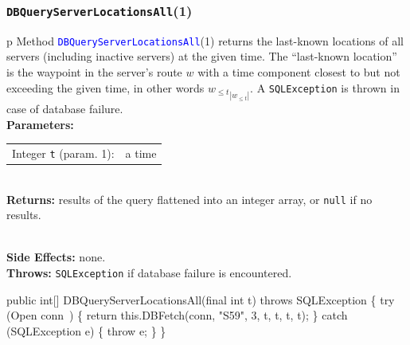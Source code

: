 \documentclass{article}
\def\nwendcode{\endtrivlist \endgroup}      %
\let\nwdocspar=\par
\theoremstyle{definition}                   %
\begin{document}
\subsubsection{{\tt{}\protect{}DBQueryServerLocationsAll}(1)}
\begin{tabular}{p{\textwidth}}
\toprule
{}
Method \textcolor{blue}{{\tt{}\protect{}DBQueryServerLocationsAll}}(1) returns the
last-known locations of all servers (including inactive servers) at the given
time. The ``last-known location'' is the waypoint in the server's route $w$
with a time component closest to but not exceeding the given time, in other
words ${w_{\leq t}}_{|w_{\leq t}|}$.
A {\tt{}SQLException} is thrown in case of database failure.\\
\midrule
\textbf{Parameters:} \\
\begin{tabular}{lp{116mm}}
Integer {\tt{}t} (param. 1):&a time
\end{tabular}\\
\textbf{Returns:} results of the query flattened into an integer array, or
{\tt{}null} if no results.

\\
\textbf{Side Effects:} none.\\
\textbf{Throws:} {\tt{}SQLException} if database failure is encountered.\\
\bottomrule
\end{tabular}
\nwenddocs{}\endmoddef{}
public int[] DBQueryServerLocationsAll(final int t) throws SQLException \{
  try (\LA{}Open \code{}conn\edoc{}~{\nwtagstyle{}}\RA{}) \{
    return this.DBFetch(conn, "S59", 3, t, t, t, t);
  \} catch (SQLException e) \{
    throw e;
  \}
\}
\eatline
{}\nwendcode{}\nwdocspar
\end{document}
